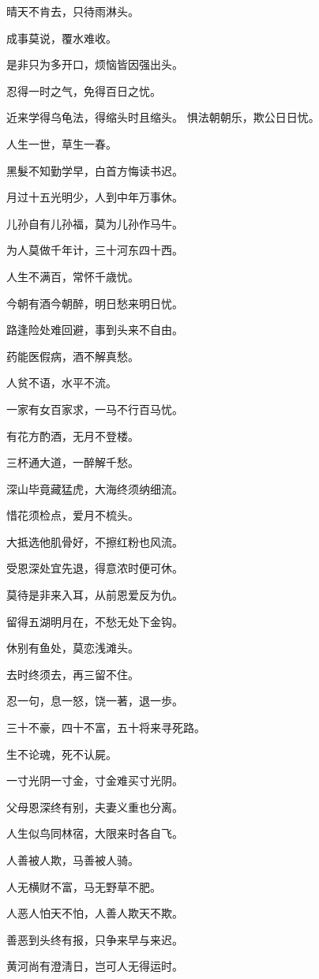 \documentclass[12pt,oneside]{book}
\begin{document}
晴天不肯去，只待雨淋头。

成事莫说，覆水难收。

是非只为多开口，烦恼皆因强出头。

忍得一时之气，免得百日之忧。

近来学得乌龟法，得缩头时且缩头。
惧法朝朝乐，欺公日日忧。


人生一世，草生一春。

黑髮不知勤学早，白首方悔读书迟。

月过十五光明少，人到中年万事休。

儿孙自有儿孙福，莫为儿孙作马牛。

为人莫做千年计，三十河东四十西。

人生不满百，常怀千歳忧。

今朝有酒今朝醉，明日愁来明日忧。

路逢险处难回避，事到头来不自由。

药能医假病，酒不解真愁。

人贫不语，水平不流。

一家有女百家求，一马不行百马忧。

有花方酌酒，无月不登楼。

三杯通大道，一醉解千愁。

深山毕竟藏猛虎，大海终须纳细流。

惜花须检点，爱月不梳头。

大抵选他肌骨好，不擦红粉也风流。

受恩深处宜先退，得意浓时便可休。

莫待是非来入耳，从前恩爱反为仇。

留得五湖明月在，不愁无处下金钩。

休别有鱼处，莫恋浅滩头。

去时终须去，再三留不住。

忍一句，息一怒，饶一著，退一歩。

三十不豪，四十不富，五十将来寻死路。

生不论魂，死不认屍。

一寸光阴一寸金，寸金难买寸光阴。

父母恩深终有别，夫妻义重也分离。

人生似鸟同林宿，大限来时各自飞。

人善被人欺，马善被人骑。

人无横财不富，马无野草不肥。

人恶人怕天不怕，人善人欺天不欺。

善恶到头终有报，只争来早与来迟。

黄河尚有澄淸日，岂可人无得运时。
\end{document}
